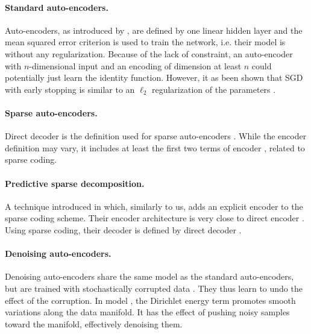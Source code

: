 \paragraph{Standard auto-encoders.}
Auto-encoders, as introduced by \cite{bourlard1988autoencoder, hinton1994autoencoder}, are defined by one linear hidden layer and the mean squared error criterion is used to train the network, i.e. their model is  without any regularization.
Because of the lack of constraint, an auto-encoder with $n$-dimensional input and an encoding of dimension at least $n$ could potentially just learn the identity function. However, it as been shown that \gls{SGD} with early stopping is similar to an $\ell_2$ regularization of the parameters \cite{zinkevich2003SGDl2regularization}.

\paragraph{Sparse auto-encoders.}
Direct decoder  is the definition used for sparse auto-encoders \cite{lecun2006sparseAutoencoders, ranzato2007stackedSparseAutoencoders}. While the encoder definition may vary, it includes at least the first two terms of encoder , related to sparse coding.

\paragraph{Predictive sparse decomposition.}
A technique introduced in \cite{lecun2010PSD} which, similarly to us, adds an explicit encoder to the sparse coding scheme. Their encoder architecture is very close to direct encoder . Using sparse coding, their decoder is defined by direct decoder .

\paragraph{Denoising auto-encoders.}
Denoising auto-encoders share the same model as the standard auto-encoders, but are trained with stochastically corrupted data  \cite{bengio2008denoisingAutoencoders}. They thus learn to undo the effect of the corruption. In model , the Dirichlet energy term promotes smooth variations along the data manifold. It has the effect of pushing noisy samples toward the manifold, effectively denoising them.


